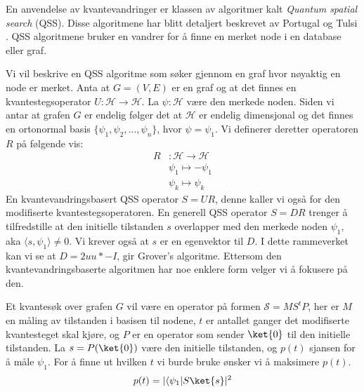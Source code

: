         En anvendelse av kvantevandringer er klassen av algoritmer kalt \emph{Quantum spatial search} (QSS). Disse algoritmene har blitt detaljert beskrevet av Portugal \cite{portugal_2019} og Tulsi \cite{PhysRevA.86.042331}. QSS algoritmene bruker en vandrer for å finne en merket node i en database eller graf.

        Vi vil beskrive en QSS algoritme som søker gjennom en graf hvor nøyaktig en node er merket. Anta at $G=(V,E)$ er en graf og at det finnes en kvantestegsoperator $U:\mathcal{H}\rightarrow\mathcal{H}$. La $\psi:\mathcal{H}$ være den merkede noden. Siden vi antar at grafen $G$ er endelig følger det at $\mathcal{H}$ er endelig dimensjonal og det finnes en ortonormal basis $\{\psi_1, \psi_2, ..., \psi_n\}$, hvor $\psi=\psi_1$. Vi definerer deretter operatoren $R$ på følgende vis:
        \begin{align*}
            R & :\mathcal{H}\rightarrow\mathcal{H} \\
            & \psi_1 \mapsto -\psi_1 \\
            &\psi_k \mapsto \psi_k
        \end{align*}
        En kvantevandringsbasert QSS operator $S=UR$, denne kaller vi også for den modifiserte kvantestegsoperatoren. En generell QSS operator $S=DR$ trenger å tilfredstille at den initielle tilstanden $s$ overlapper med den merkede noden $\psi_1$, aka $\langle s,\psi_1\rangle\neq 0$. Vi krever også at $s$ er en egenvektor til $D$. I dette rammeverket kan vi se at $D=2uu*-I$, gir Grover's algoritme.  Ettersom den kvantevandringsbaserte algoritmen har noe enklere form velger vi å fokusere på den.
        
        Et kvantesøk over grafen $G$ vil være en operator på formen $\mathcal{S} = MS^tP$, her er $M$ en måling av tilstanden i basisen til nodene, $t$ er antallet ganger det modifiserte kvantesteget skal kjøre, og $P$ er en operator som sender $\ket{0}$ til den initielle tilstanden. La $s = P(\ket{0})$ være den initielle tilstanden, og $p(t)$ sjansen for å måle $\psi_1$. For å finne ut hvilken $t$ vi burde bruke ønsker vi å maksimere $p(t)$.
        \begin{align*}
            p(t) = |\langle\psi_1|S\ket{s}|^2 
        \end{align*}

